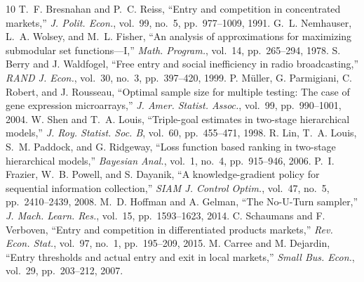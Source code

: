 \documentclass[journal,a4paper]{IEEEtran}
\begin{document}
\begin{thebibliography}{10}
T.~F. Bresnahan and P.~C. Reiss, ``Entry and competition in concentrated markets,'' \emph{J. Polit. Econ.}, vol.~99, no.~5, pp.~977--1009, 1991.
G.~L. Nemhauser, L.~A. Wolsey, and M.~L. Fisher, ``An analysis of approximations for maximizing submodular set functions---I,'' \emph{Math. Program.}, vol.~14, pp.~265--294, 1978.
S. Berry and J. Waldfogel, ``Free entry and social inefficiency in radio broadcasting,'' \emph{RAND J. Econ.}, vol.~30, no.~3, pp.~397--420, 1999.
P. M\"uller, G. Parmigiani, C. Robert, and J. Rousseau, ``Optimal sample size for multiple testing: The case of gene expression microarrays,'' \emph{J. Amer. Statist. Assoc.}, vol.~99, pp.~990--1001, 2004.
W. Shen and T.~A. Louis, ``Triple-goal estimates in two-stage hierarchical models,'' \emph{J. Roy. Statist. Soc. B}, vol.~60, pp.~455--471, 1998.
R. Lin, T.~A. Louis, S.~M. Paddock, and G. Ridgeway, ``Loss function based ranking in two-stage hierarchical models,'' \emph{Bayesian Anal.}, vol.~1, no.~4, pp.~915--946, 2006.
P.~I. Frazier, W.~B. Powell, and S. Dayanik, ``A knowledge-gradient policy for sequential information collection,'' \emph{SIAM J. Control Optim.}, vol.~47, no.~5, pp.~2410--2439, 2008.
M.~D. Hoffman and A. Gelman, ``The No-U-Turn sampler,'' \emph{J. Mach. Learn. Res.}, vol.~15, pp.~1593--1623, 2014.
C. Schaumans and F. Verboven, ``Entry and competition in differentiated products markets,'' \emph{Rev. Econ. Stat.}, vol.~97, no.~1, pp.~195--209, 2015.
M. Carree and M. Dejardin, ``Entry thresholds and actual entry and exit in local markets,'' \emph{Small Bus. Econ.}, vol.~29, pp.~203--212, 2007.
\end{thebibliography}
\end{document}
